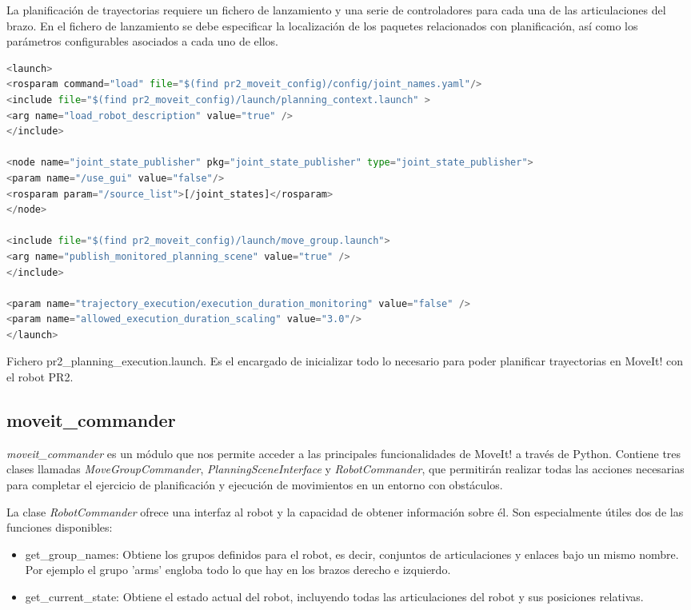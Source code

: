 \documentclass[12pt,spanish,chapterprefix, numbers=noenddot]{book}
\numberwithin{equation}{section}
\numberwithin{figure}{section}
\begin{document}
La planificación de trayectorias requiere un fichero de lanzamiento y una serie de controladores para cada una de las articulaciones del brazo. 
En el fichero de lanzamiento se debe especificar la localización de los paquetes relacionados con planificación, así como los parámetros configurables asociados a cada uno de ellos. 
\vspace{20pt}
\begin{algorithm}[htb!]
	\begin{lstlisting}[breaklines=true,language=python]  
<launch>
<rosparam command="load" file="$(find pr2_moveit_config)/config/joint_names.yaml"/>
<include file="$(find pr2_moveit_config)/launch/planning_context.launch" >
<arg name="load_robot_description" value="true" />
</include>

<node name="joint_state_publisher" pkg="joint_state_publisher" type="joint_state_publisher">
<param name="/use_gui" value="false"/>
<rosparam param="/source_list">[/joint_states]</rosparam>
</node>

<include file="$(find pr2_moveit_config)/launch/move_group.launch">
<arg name="publish_monitored_planning_scene" value="true" />
</include>

<param name="trajectory_execution/execution_duration_monitoring" value="false" />
<param name="allowed_execution_duration_scaling" value="3.0"/>
</launch>
	\end{lstlisting}
\caption{\label{alg:pr2_planning_execution}Fichero pr2\_planning\_execution.launch. Es el encargado de inicializar todo lo necesario para poder planificar trayectorias en MoveIt! con el robot PR2.}
\end{algorithm}
\subsection{moveit\_commander}
\textit{moveit\_commander} es un módulo que nos permite acceder a las principales funcionalidades de MoveIt! a través de Python. Contiene tres clases llamadas  \textit{MoveGroupCommander}, \textit{PlanningSceneInterface} y \textit{RobotCommander}, que permitirán realizar todas las acciones necesarias para completar el ejercicio de planificación y ejecución de movimientos en un entorno con obstáculos. 

La clase \textit{RobotCommander} ofrece una interfaz al robot y la capacidad de obtener información sobre él. Son especialmente útiles dos de las funciones disponibles: 
\begin{itemize}
\item get\_group\_names: Obtiene los grupos definidos para el robot, es decir, conjuntos de articulaciones y enlaces bajo un mismo nombre.  Por ejemplo el grupo 'arms' engloba todo lo que hay en los brazos derecho e izquierdo. 
\item get\_current\_state: Obtiene el estado actual del robot, incluyendo todas las articulaciones del robot y sus posiciones relativas. 
\end{itemize}
\end{document}
